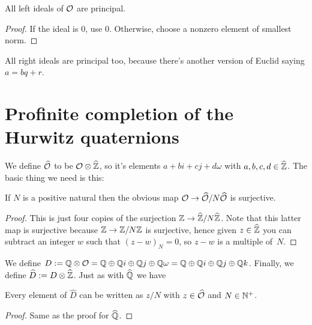 \begin{corollary}
    \label{Hurwitz.left_ideal_princ}
    \leanok
    All left ideals of $\mathcal{O}$ are principal.
\end{corollary}
\begin{proof}
    \leanok
    If the ideal is 0, use 0. Otherwise, choose a nonzero element of smallest norm.
\end{proof}

\begin{remark}
    All right ideals are principal too, because there's
    another version of Euclid saying $a=bq+r$.
\end{remark}

\section{Profinite completion of the Hurwitz quaternions}

We define $\widehat{\mathcal{O}}$ to be $\mathcal{O}\otimes\widehat{\mathbb{Z}}$, so it's elements $a+bi+cj+d\omega$
with $a,b,c,d\in\widehat{\mathbb{Z}}$. The basic thing we need is this:

\begin{theorem}
    \label{Hurwitz.surjective_pnat_quotient}
    If $N$ is a positive natural then the obvious map $\mathcal{O}\to\widehat{\mathcal{O}}/N\widehat{\mathcal{O}}$ is surjective.
\end{theorem}
\begin{proof}
    This is just four copies of the surjection $\mathbb{Z}\to\widehat{\mathbb{Z}}/N\widehat{\mathbb{Z}}$.
    Note that this latter map is surjective because $\mathbb{Z}\to\mathbb{Z}/N\mathbb{Z}$ is surjective,
    hence given $z\in\widehat{\mathbb{Z}}$ you can subtract an integer $w$ such
    that $(z-w)_N=0$, so $z-w$ is a multiple of~$N$.
\end{proof}

We define $D:=\mathbb{Q}\otimes\mathcal{O}=\mathbb{Q}\oplus\mathbb{Q} i\oplus\mathbb{Q} j\oplus\mathbb{Q}\omega=\mathbb{Q}\oplus\mathbb{Q} i\oplus\mathbb{Q} j\oplus\mathbb{Q} k$.
Finally, we define $\widehat{D}:=D\otimes\widehat{\mathbb{Z}}$. Just as with $\widehat{\mathbb{Q}}$ we have

\begin{lemma}
    \label{Hurwitz.canonicalForm}
    \leanok
    Every element of $\widehat{D}$ can be written as $z/N$ with $z\in\widehat{\mathcal{O}}$ and $N\in\mathbb{N}^+$.
\end{lemma}
\begin{proof}
    Same as the proof for $\widehat{\mathbb{Q}}$.
\end{proof}

